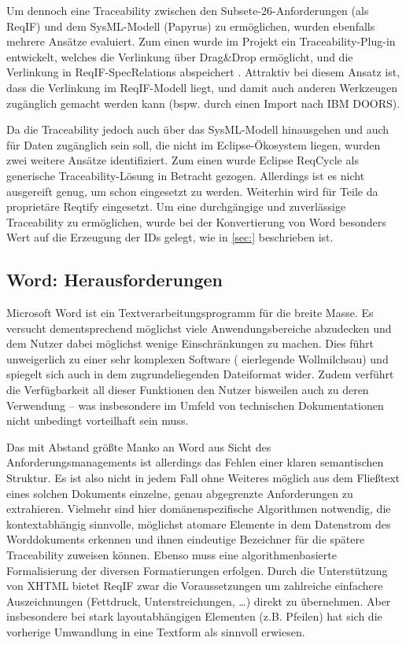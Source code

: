 \documentclass[twoside]{article}
\begin{document}
\begin{multicols}{2}
Um dennoch eine Traceability zwischen den Subsete-26-Anforderungen (als ReqIF) und dem SysML-Modell (Papyrus) zu ermöglichen, wurden ebenfalls mehrere Ansätze evaluiert.  Zum einen wurde im Projekt ein Traceability-Plug-in entwickelt, welches die Verlinkung über Drag\&Drop ermöglicht, und die Verlinkung in ReqIF-SpecRelations abspeichert \cite{rmf-traces}.  Attraktiv bei diesem Ansatz ist, dass die Verlinkung im ReqIF-Modell liegt, und damit auch anderen Werkzeugen zugänglich gemacht werden kann (bspw. durch einen Import nach IBM DOORS).

Da die Traceability jedoch auch über das SysML-Modell hinausgehen und auch für Daten zugänglich sein soll, die nicht im Eclipse-Ökosystem liegen, wurden zwei weitere Ansätze identifiziert.  Zum einen wurde Eclipse ReqCycle \cite{} als generische Traceability-Lösung in Betracht gezogen.  Allerdings ist es nicht ausgereift genug, um schon eingesetzt zu werden.  Weiterhin wird für Teile da proprietäre Reqtify eingesetzt.  Um eine durchgängige und zuverlässige Traceability zu ermöglichen, wurde bei der Konvertierung von Word besonders Wert auf die Erzeugung der IDs gelegt, wie in \ref{sec:} beschrieben ist.

\subsection{Word: Herausforderungen}

Microsoft Word ist ein Textverarbeitungsprogramm für die breite Masse. Es versucht dementsprechend möglichst viele Anwendungsbereiche abzudecken und dem Nutzer dabei möglichst wenige Einschränkungen zu machen. Dies führt unweigerlich zu einer sehr komplexen Software (\glqq{} eierlegende Wollmilchsau\grqq{}) und spiegelt sich auch in dem zugrundeliegenden Dateiformat wider. Zudem verführt die Verfügbarkeit all dieser Funktionen den Nutzer bisweilen auch zu deren Verwendung -- was insbesondere im Umfeld von technischen Dokumentationen nicht unbedingt vorteilhaft sein muss.

Das mit Abstand größte Manko an Word aus Sicht des Anforderungsmanagements ist allerdings das Fehlen einer klaren semantischen Struktur. Es ist also nicht in jedem Fall ohne Weiteres möglich aus dem Fließtext eines solchen Dokuments einzelne, genau abgegrenzte Anforderungen zu extrahieren. Vielmehr sind hier domänenspezifische Algorithmen notwendig, die kontextabhängig sinnvolle, möglichst atomare Elemente in dem Datenstrom des Worddokuments erkennen und ihnen eindeutige Bezeichner für die spätere Traceability zuweisen können. Ebenso muss eine algorithmenbasierte Formalisierung der diversen Formatierungen erfolgen. Durch die Unterstützung von XHTML bietet ReqIF zwar die Voraussetzungen um zahlreiche einfachere Auszeichnungen (Fettdruck, Unterstreichungen, \ldots{}) direkt zu übernehmen. Aber insbesondere bei stark layoutabhängigen Elementen (z.B. Pfeilen) hat sich die vorherige Umwandlung in eine Textform als sinnvoll erwiesen.


\end{multicols}
\end{document}
